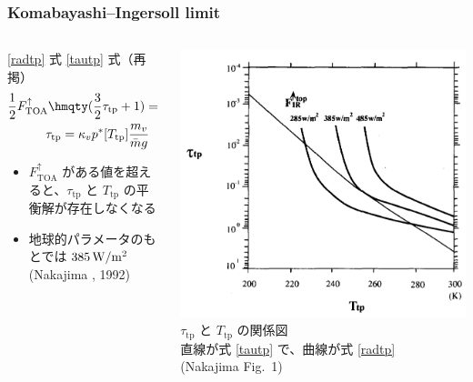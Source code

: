 \documentclass[aspectratio=149]{beamer}
\newcommand{\hmTOA}{\mathrm{TOA}}
\newcommand{\hmtp}{\mathrm{tp}}
\renewcommand{\qty}{\hmqty}
\begin{document}
\begin{frame}
	\frametitle{Komabayashi--Ingersoll limit}
	\begin{columns}
		\begin{column}{.55\textwidth}
			\begin{block}{\eqref{radtp} 式 \eqref{tautp} 式（再掲）}
				\begin{gather}
					\frac{1}{2}F^\uparrow_\hmTOA\qty(\frac{3}{2}\tau_\hmtp+1)=\sigma T^4_\hmtp\tag{\ref{radtp}}\\
					\tau_\hmtp=\kappa_vp^*[T_\hmtp]\frac{m_v}{\bar mg}\tag{\ref{tautp}}
				\end{gather}
			\end{block}
			\begin{itemize}
				\item \(F^\uparrow_\hmTOA\) がある値を超えると、\(\tau_\hmtp\) と
					\(T_\hmtp\) の平衡解が存在しなくなる
				\item 地球的パラメータのもとでは \(385\hmu{W/m^2}\) (Nakajima \etal*, 1992)
			\end{itemize}
		\end{column}
		\begin{column}{.45\textwidth}
			\centering
			\includegraphics[width=\textwidth]{nakajima1.png}\\
			\scriptsize
			\(\tau_\hmtp\) と \(T_\hmtp\) の関係図\\
			直線が式 \eqref{tautp} で、曲線が式 \eqref{radtp}\\
			(Nakajima \etal Fig.~1)
		\end{column}
	\end{columns}
\end{frame}
\end{document}
